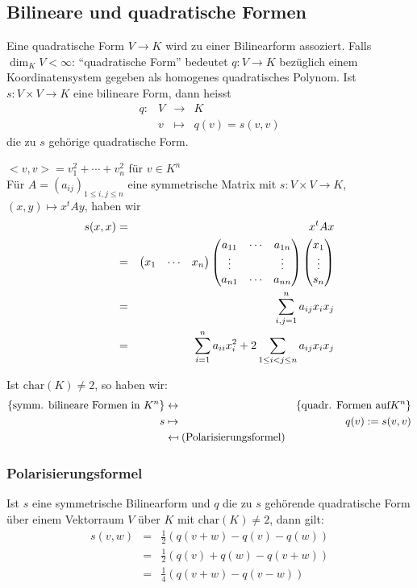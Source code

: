 \subsection{Bilineare und quadratische Formen}
Eine quadratische Form $V\to K$ wird zu einer Bilinearform assoziert. Falls $\dim_KV<\infty$: ``quadratische Form'' bedeutet $q:V\to K$ bezüglich einem Koordinatensystem gegeben als homogenes quadratisches Polynom. Ist $s:V\times V\to K$ eine bilineare Form, dann heisst
\begin{align*}
  q:&V&\to&K\\
  &v& \mapsto &q(v)=s(v,v)
\end{align*}
die zu $s$ gehörige quadratische Form.
\begin{Bsp}
  $<v,v>=v_1^2+\cdots+v_n^2$ für $v\in K^n$\\
  Für $A=(a_{ij})_{1\leq i, j\leq n}$ eine symmetrische Matrix mit $s:V\times V\to K$, $(x,y)\mapsto x^tAy$, haben wir
  \begin{align*}
    s(x,x)&=& x^tAx\\
    &=& \begin{pmatrix}x_1&\cdots&x_n\end{pmatrix}\begin{pmatrix}a_{11}&\cdots&a_{1n}\\ \vdots&&\vdots\\ a_{n1}&\cdots&a_{nn}\end{pmatrix}\begin{pmatrix}x_1\\ \vdots \\ s_n\end{pmatrix}\\
    &=& \sum^n_{i,j=1}a_{ij}x_ix_j\\
    &=& \sum^n_{i=1}a_{ii}x_i^2+2\sum_{1\leq i<j\leq n}a_{ij}x_ix_j
  \end{align*}
\end{Bsp}
Ist $\text{char}(K)\neq 2$, so haben wir:
\begin{align*}
  \{\text{symm. bilineare Formen in $K^n$}\}&\leftrightarrow&\{\text{quadr. Formen auf} K^n\}\\
  s&\mapsto &q(v):=s(v,v)\\
  &\mapsfrom (\text{Polarisierungsformel}) &
\end{align*}
\subsubsection{Polarisierungsformel}
Ist $s$ eine symmetrische Bilinearform und $q$ die zu $s$ gehörende quadratische Form über einem Vektorraum $V$ über $K$ mit $\text{char}(K)\neq 2$, dann gilt: 
\begin{align*}
  s(v,w)&=& \frac{1}{2}\left( q(v+w) - q(v) - q(w) \right)\\
  &=& \frac{1}{2}\left( q(v)+q(w)-q(v+w) \right)\\
  &=& \frac{1}{4}\left( q(v+w)-q(v-w) \right)
\end{align*}
